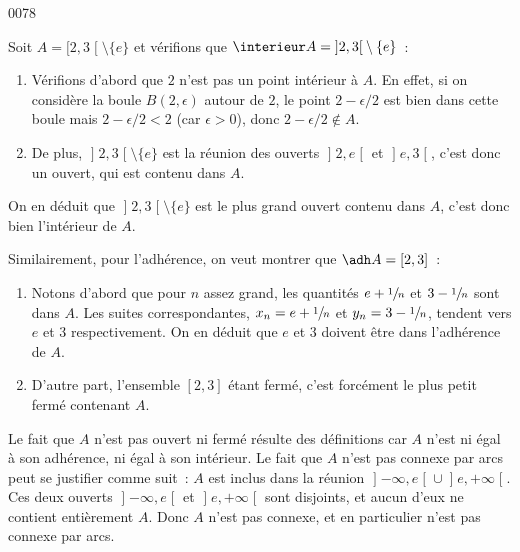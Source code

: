 
\begin{corrige}{0078}



Soit $A = \mathopen[2,3\mathclose[\setminus\{e\}$ et vérifions que
$\interieur A = \mathopen]2,3\mathclose[\setminus\{e\}$~:
\begin{enumerate}
\item Vérifions d'abord que $2$ n'est pas un point intérieur à $A$. En
  effet, si on considère la boule $B(2,\epsilon)$ autour de $2$, le
  point $2 - \epsilon/2$ est bien dans cette boule mais $2 -
  \epsilon/2 < 2$ (car $\epsilon > 0$), donc $2 - \epsilon/2 \notin
  A$.

\item De plus, $\mathopen]2,3\mathclose[\setminus\{e\}$ est la réunion
  des ouverts $\mathopen]2,e\mathclose[$ et
  $\mathopen]e,3\mathclose[$, c'est donc un ouvert, qui est contenu
  dans $A$.
\end{enumerate}

On en déduit que $\mathopen]2,3\mathclose[\setminus\{e\}$ est le plus
grand ouvert contenu dans $A$, c'est donc bien l'intérieur de $A$.

Similairement, pour l'adhérence, on veut montrer que $\adh A =
[2,3]$~:
\begin{enumerate}
\item Notons d'abord que pour $n$ assez grand, les quantités $e +
  \sfrac1n$ et $3 - \sfrac1n$ sont dans $A$. Les suites
  correspondantes, $x_n = e + \sfrac1n$ et $y_n = 3- \sfrac1n$,
  tendent vers $e$ et $3$ respectivement. On en déduit que $e$ et $3$
  doivent être dans l'adhérence de $A$.

\item D'autre part, l'ensemble $[2,3]$ étant fermé, c'est forcément le
  plus petit fermé contenant $A$.
\end{enumerate}

Le fait que $A$ n'est pas ouvert ni fermé résulte des définitions car
$A$ n'est ni égal à son adhérence, ni égal à son intérieur. Le fait
que $A$ n'est pas connexe par arcs peut se justifier comme suit~: $A$
est inclus dans la réunion $\mathopen]-\infty,e\mathclose[ \cup
\mathopen ]e,+\infty\mathclose[$. Ces deux ouverts
$\mathopen]-\infty,e\mathclose[$ et $\mathopen ]e,+\infty\mathclose[$
sont disjoints, et aucun d'eux ne contient entièrement $A$. Donc $A$
n'est pas connexe, et en particulier n'est pas connexe par arcs.


\end{corrige}
